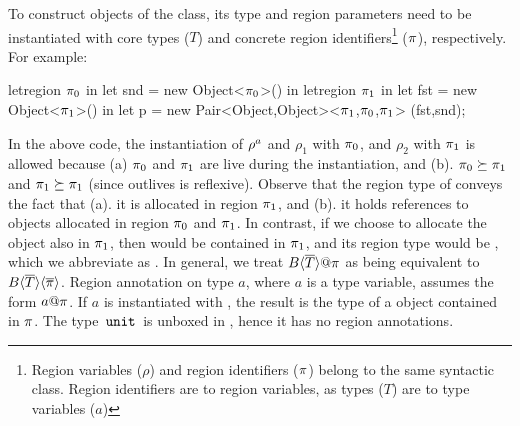 To construct objects of the  class, its type and region
parameters need to be instantiated with core types ($T$) and concrete
region identifiers\footnote{Region variables ($\rho$) and region
identifiers ($\pi$) belong to the same syntactic class. Region
identifiers are to region variables, as types ($T$) are to type
variables ($a$)} ($\pi$), respectively. For example:
\begin{codejava}
letregion $\pi_0$ in
  let snd = new Object<$\pi_0$>() in
  letregion $\pi_1$ in
    let fst = new Object<$\pi_1$>() in
    let p = new Pair<Object,Object><$\pi_1$,$\pi_0$,$\pi_1$>
                  (fst,snd);
\end{codejava}
In the above code, the instantiation of $\rho^a$ and $\rho_1$ with
$\pi_0$, and $\rho_2$ with $\pi_1$ is allowed because (a) $\pi_0$
and $\pi_1$ are live during the instantiation, and (b). $\pi_0
\succeq \pi_1$ and $\pi_1 \succeq \pi_1$ (since outlives is
reflexive). Observe that the region type of  conveys
the fact that (a). it is allocated in region $\pi_1$, and (b). it
holds references to objects allocated in region $\pi_0$ and $\pi_1$.
In contrast, if we choose to allocate the  object also in
$\pi_1$, then  would be contained in $\pi_1$, and its region
type would be , which
we abbreviate as . {In general, we treat
$B\inang{\tbar}@\rgn$ as being equivalent to
$B\langle \overline{T} \rangle\langle \overline{\pi} \rangle$}. Region annotation on type $a$, where
$a$ is a type variable, assumes the form $a@\pi$. If $a$ is
instantiated with , the result is the type of a
 object contained in  $\pi$. The type $\,{\tt unit}\,$ is unboxed in
\FB, hence it has no region annotations.


